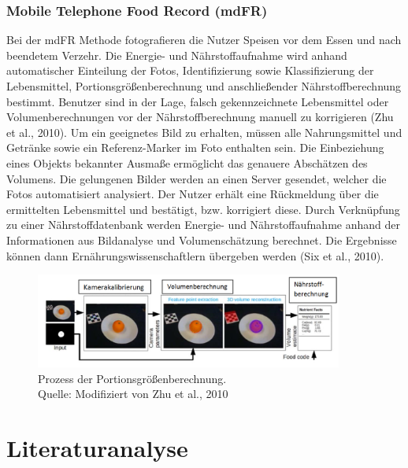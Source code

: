 \subsubsection{Mobile Telephone Food Record (mdFR)}

Bei der mdFR Methode fotografieren die Nutzer Speisen vor dem Essen und nach beendetem Verzehr. Die Energie- und Nährstoffaufnahme wird anhand automatischer Einteilung der Fotos, Identifizierung sowie Klassifizierung der Lebensmittel, Portionsgrößenberechnung und anschließender Nährstoffberechnung bestimmt. Benutzer sind in der Lage, falsch gekennzeichnete Lebensmittel oder Volumenberechnungen vor der Nährstoffberechnung manuell zu korrigieren (Zhu et al., 2010). Um ein geeignetes Bild  zu erhalten, müssen alle Nahrungsmittel und Getränke sowie ein Referenz-Marker im Foto enthalten sein. Die Einbeziehung eines Objekts bekannter Ausmaße ermöglicht das genauere Abschätzen des Volumens. Die gelungenen Bilder werden an einen Server gesendet, welcher die Fotos automatisiert analysiert. Der Nutzer erhält eine Rückmeldung über die ermittelten Lebensmittel und bestätigt, bzw. korrigiert diese. Durch Verknüpfung zu einer Nährstoffdatenbank werden  Energie- und Nährstoffaufnahme anhand der Informationen aus Bildanalyse und Volumenschätzung berechnet. Die Ergebnisse können dann Ernährungswissenschaftlern übergeben werden (Six et al., 2010).


\begin{figure}[h]
	\centering
	\includegraphics[width=0.9\textwidth]{Bilder/mdFR.png}
	\caption[Prozess der Portionsgrößenberechnung]{ Prozess der Portionsgrößenberechnung. \\ Quelle: Modifiziert von Zhu et al., 2010}
	\label{bild4}
\end{figure}




\newpage
\section{Literaturanalyse}

